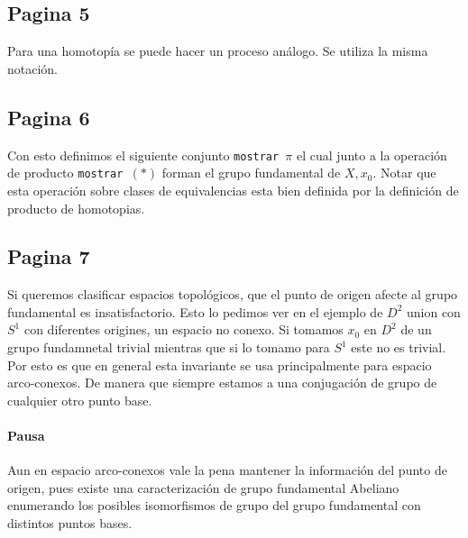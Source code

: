 \documentclass[letterpaper]{article}
\begin{document}
\subsection*{Pagina 5}
Para una homotopía se puede hacer un proceso análogo. Se utiliza la
misma notación.

\subsection*{Pagina 6}
Con esto definimos el siguiente conjunto
\texttt{mostrar \(\pi\)} el cual junto a la operación de producto
\texttt{mostrar \((*)\)} forman el grupo fundamental de \(X,x_0\). Notar
que esta operación sobre clases de equivalencias esta bien definida por
la definición de producto de homotopias.

\subsection*{Pagina 7}
Si queremos clasificar espacios topológicos, que el punto de origen
afecte al grupo fundamental es insatisfactorio. Esto lo pedimos ver en
el ejemplo de \(D^2\) union con \(S^1\) con diferentes origines, un
espacio no conexo. Si tomamos \(x_0\) en \(D^2\) de un grupo fundamnetal
trivial mientras que si lo tomamo para \(S^1\) este no es trivial. Por
esto es que en general esta invariante se usa principalmente para
espacio arco-conexos. De manera que siempre estamos a una conjugación de
grupo de cualquier otro punto base.

\paragraph{Pausa}
Aun en espacio arco-conexos vale la pena mantener la información del
punto de origen, pues existe una caracterización de grupo fundamental
Abeliano enumerando los posibles isomorfismos de grupo del grupo
fundamental con distintos puntos bases.
\end{document}

